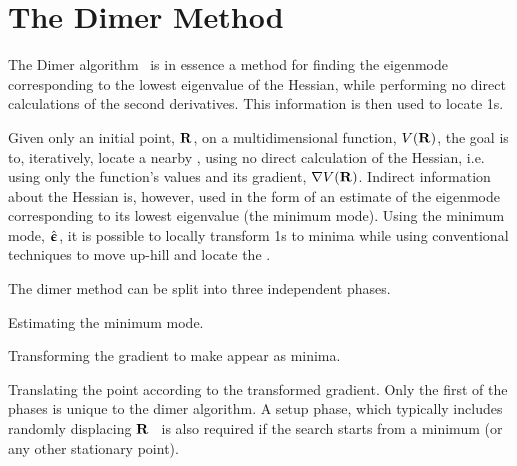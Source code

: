 \section{The Dimer Method}
\label{sec:dimer}


The Dimer algorithm~\cite{dimer-original-1999} is in essence a method for finding the eigenmode corresponding to the lowest eigenvalue of the Hessian, while performing no direct calculations of the second derivatives\cite{hyperdynamics-voter-1997}.
This information is then used to locate \sap1s.

Given only an initial point, ${\mathrm{\mathbf{\bm{R}}}}$, on a multidimensional function, $V({\mathrm{\mathbf{\bm{R}}}})$, the goal is to, iteratively, locate a nearby , using no direct calculation of the Hessian, i.e. using only the function's values and its gradient, $\nabla V({\mathrm{\mathbf{\bm{R}}}})$.
Indirect information about the Hessian is, however, used in the form of an estimate of the eigenmode corresponding to its lowest eigenvalue (the minimum mode).
Using the minimum mode, $\hat{{\mathrm{\mathbf{\bm{\upepsilon}}}}}$, it is possible to locally transform \sap1s to minima while using conventional techniques to move up-hill and locate the .

The dimer method can be split into three independent phases.
\item Estimating the minimum mode.
\item Transforming the gradient to make  appear as minima.
\item Translating the point according to the transformed gradient.
\een
Only the first of the phases is unique to the dimer algorithm.
A setup phase, which typically includes randomly displacing ${\mathrm{\mathbf{\bm{R}}}}$~\cite{random-sampling-2011} is also required if the search starts from a minimum (or any other stationary point).

